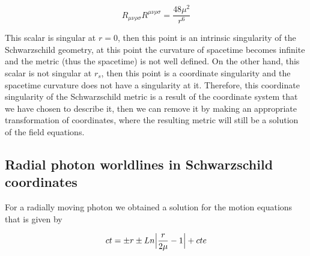 \documentclass[letterpaper,11pt,onecolumn]{article}
\begin{document}
\begin{equation*}
    R_{\mu\nu\rho\sigma}R^{\mu\nu\rho\sigma}=\frac{48\mu^2}{r^6}
\end{equation*}

This scalar is singular at $r=0$, then this point is an intrinsic singularity of the Schwarzschild geometry, at this point the curvature of spacetime becomes infinite and the metric (thus the spacetime) is not well defined. On the other hand, this scalar is not singular at $r_s$, then this point is a coordinate singularity and the spacetime curvature does not have a singularity at it. Therefore, this coordinate singularity of the Schwarzschild metric is a result of the coordinate system that we have chosen to describe it, then we can remove it by making an appropriate transformation of coordinates, where the resulting metric will still be a solution of the field equations.

\subsection{Radial photon worldlines in Schwarzschild coordinates}

For a radially moving photon we obtained a solution for the motion equations that is given by

\begin{equation}
ct=\pm r\pm Ln\Big| \frac{r}{2\mu}-1 \Big|+cte \label{3}\\
\end{equation}
\end{document}
